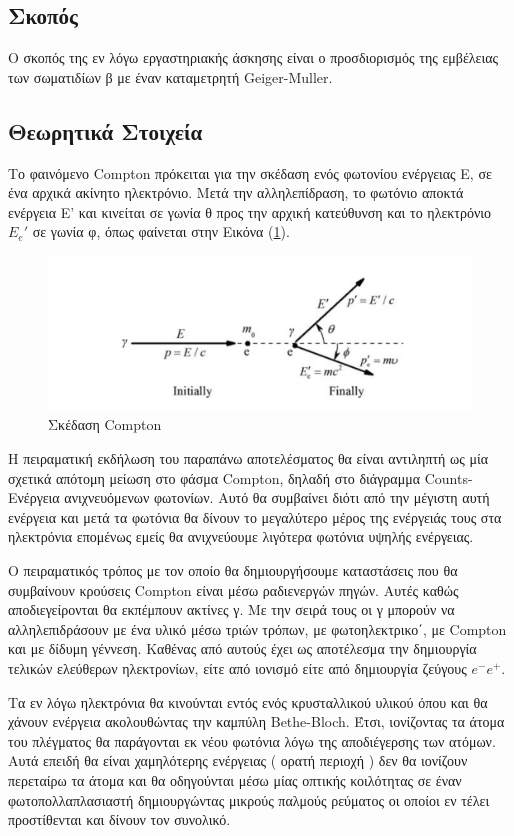 \documentclass[a4paper]{article}
\begin{document}
\subsection*{Σκοπός}
	Ο σκοπός της εν λόγω εργαστηριακής άσκησης είναι ο προσδιορισμός της εμβέλειας των σωματιδίων β με έναν καταμετρητή Geiger-Muller.
\subsection*{Θεωρητικά Στοιχεία}
	Το φαινόμενο Compton πρόκειται για την σκέδαση ενός φωτονίου ενέργειας Ε, σε ένα αρχικά ακίνητο ηλεκτρόνιο.
	Μετά την αλληλεπίδραση, το φωτόνιο αποκτά ενέργεια Ε' και κινείται σε γωνία θ προς την αρχική κατεύθυνση και το ηλεκτρόνιο $E_{e}'$ σε γωνία φ, όπως φαίνεται στην Εικόνα (\ref{fig1}). 
	\begin{figure}[h!]
		\centering
		\includegraphics[scale=0.5]{compton.png}
		\caption{Σκέδαση Compton}
		\label{fig1}
	\end{figure}
	
	
	
		Η πειραματική εκδήλωση του παραπάνω αποτελέσματος θα είναι αντιληπτή ως μία σχετικά απότομη μείωση στο φάσμα Compton, δηλαδή στο διάγραμμα Counts-Ενέργεια ανιχνευόμενων φωτονίων. Αυτό θα συμβαίνει διότι από την μέγιστη αυτή ενέργεια και μετά τα φωτόνια θα δίνουν το μεγαλύτερο μέρος της ενέργειάς τους στα ηλεκτρόνια επομένως εμείς θα ανιχνεύουμε λιγότερα φωτόνια υψηλής ενέργειας.
	
	
	Ο πειραματικός τρόπος με τον οποίο θα δημιουργήσουμε καταστάσεις που θα συμβαίνουν κρούσεις Compton είναι μέσω ραδιενεργών πηγών. Αυτές καθώς αποδιεγείρονται θα εκπέμπουν ακτίνες γ. Με την σειρά τους οι γ μπορούν να αλληλεπιδράσουν με ένα υλικό μέσω τριών τρόπων, με φωτοηλεκτρικο΄, με Compton και με δίδυμη γέννεση. Καθένας από αυτούς έχει ως αποτέλεσμα την δημιουργία τελικών ελεύθερων ηλεκτρονίων, είτε από ιονισμό είτε από δημιουργία ζεύγους $e^-e^+$.
	
	
	Τα εν λόγω ηλεκτρόνια θα κινούνται εντός ενός κρυσταλλικού υλικού όπου και θα χάνουν ενέργεια ακολουθώντας την καμπύλη Bethe-Bloch.  Έτσι, ιονίζοντας τα άτομα του πλέγματος θα παράγονται εκ νέου φωτόνια λόγω της αποδιέγερσης των ατόμων. Αυτά επειδή θα είναι χαμηλότερης ενέργειας ( ορατή περιοχή ) δεν θα ιονίζουν περεταίρω τα άτομα και θα οδηγούνται μέσω μίας οπτικής κοιλότητας σε έναν φωτοπολλαπλασιαστή δημιουργώντας μικρούς παλμούς ρεύματος οι οποίοι εν τέλει προστίθενται και δίνουν τον συνολικό.
	
\end{document}
